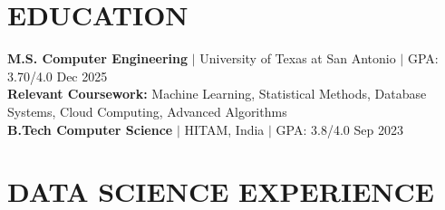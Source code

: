 \documentclass[10pt,letterpaper]{article}
\begin{document}
\section{EDUCATION}
{\small \textbf{M.S. Computer Engineering} $|$ University of Texas at San Antonio $|$ GPA: 3.70/4.0 \hfill Dec 2025 \\
\textbf{Relevant Coursework:} Machine Learning, Statistical Methods, Database Systems, Cloud Computing, Advanced Algorithms \\
\textbf{B.Tech Computer Science} $|$ HITAM, India $|$ GPA: 3.8/4.0 \hfill Sep 2023}

\section{DATA SCIENCE EXPERIENCE}

\end{document}
